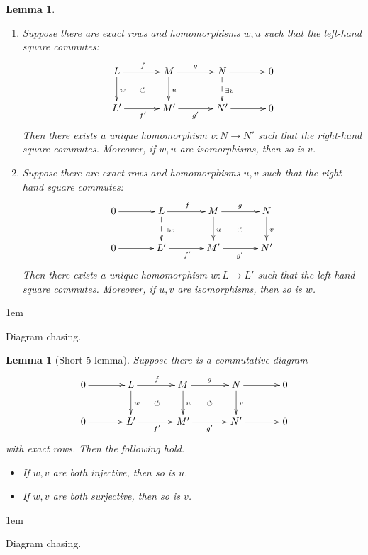 \documentclass[11pt,a4paper]{article}
\makeatletter
\numberwithin{equation}{section}
\renewenvironment{proof}[1][\proofname]{\par
    \pushQED{\qed}%
    \normalfont \topsep0\p@\@plus6\p@ \labelsep1em\relax
    \trivlist
    \item[\hskip\labelsep\indent
        \bfseries #1]\ignorespaces
    \mbox{}
}{
    \popQED\endtrivlist\@endpefalse
}
\theoremstyle{all}
\newtheorem{lemma}[theorem]{Lemma}
\theoremstyle{remark}
\makeatother
\begin{document}
\begin{lemma}
\begin{enumerate}
\item Suppose there are exact rows and homomorphisms $w,u$ such that the left-hand square commutes:
\[
\xymatrix@C=35pt{
 L \ar[r]^{f}\ar[d]^{w}\ar@{}[rd]|{\circlearrowleft} & M\ar[r]^{g}\ar[d]^{u}& N\ar[r]\ar@{-->}[d]^{\exists v}&0 \\
 L' \ar[r]_{f'} &M'\ar[r]_{g'}& N'\ar[r]&0 \\
}
\]
Then there exists a unique homomorphism $v:N\to N'$ such that the right-hand square commutes.  Moreover, if $w,u$ are isomorphisms, then so is $v$.

\item Suppose there are exact rows and homomorphisms $u,v$ such that the right-hand square commutes:
\[
\xymatrix@C=35pt{
 0\ar[r] & L \ar[r]^{f}\ar@{-->}[d]^{\exists w} & M\ar[r]^{g}\ar@{}[rd]|{\circlearrowleft} \ar[d]^{u}& N\ar[d]^{v} \\
 0\ar[r] & L' \ar[r]_{f'} &M'\ar[r]_{g'}& N' \\
}
\]
Then there exists a unique homomorphism $w:L\to L'$ such that the left-hand square commutes.  Moreover, if $u,v$ are isomorphisms, then so is $w$.
\end{enumerate}
\end{lemma}
\begin{proof}
Diagram chasing.
\end{proof}

\begin{lemma}[Short 5-lemma]\label{lem:short 5lem}
Suppose there is a commutative diagram
\[
\xymatrix@C=35pt{
0\ar[r] & L \ar[r]^{f}\ar[d]^{w}\ar@{}[rd]|{\circlearrowleft} & M\ar[r]^{g}\ar[d]^{u}\ar@{}[rd]|{\circlearrowleft}& N\ar[r]\ar[d]^{v}&0 \\
0\ar[r] & L' \ar[r]_{f'} &M'\ar[r]_{g'}& N'\ar[r]&0 \\
}
\]
with exact rows.
Then the following hold.
\begin{itemize}
\item If $w,v$ are both injective, then so is $u$.
\item If $w,v$ are both surjective, then so is $v$.
\end{itemize}
\end{lemma}
\begin{proof}
Diagram chasing.
\end{proof}

\pagebreak
\end{document}

